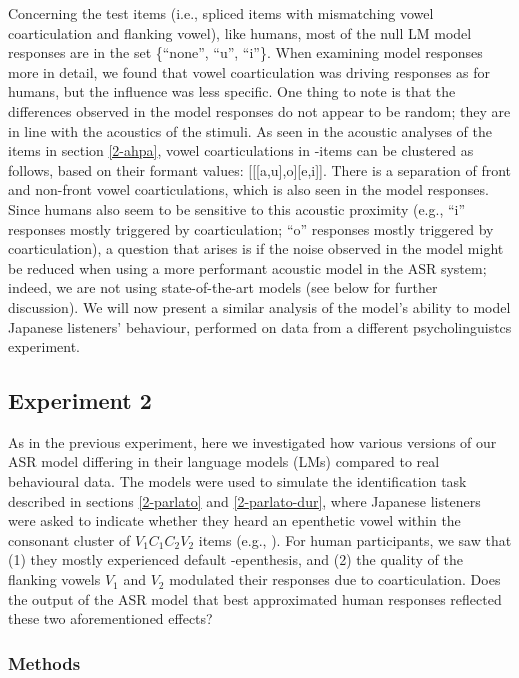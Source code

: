 {Concerning the test items (i.e., spliced items with mismatching vowel coarticulation and flanking vowel), like humans, most of the null LM model responses are in the set \{``none'', ``u'', ``i''\}. When examining model responses more in detail, we found that vowel coarticulation was driving responses as for humans, but the influence was less specific. One thing to note is that the differences observed in the model responses do not appear to be random; they are in line with the acoustics of the stimuli. As seen in the acoustic analyses of the items in section \ref{2-ahpa}, vowel coarticulations in -items can be clustered as follows, based on their formant values: [[[a,u],o][e,i]]. There is a separation of front and non-front vowel coarticulations, which is also seen in the model responses. Since humans also seem to be sensitive to this acoustic proximity (e.g., ``i'' responses mostly triggered by \textipa{[i,e]} coarticulation; ``o'' responses mostly triggered by \textipa{[o,u]} coarticulation), a question that arises is if the noise observed in the model might be reduced when using a more performant acoustic model in the ASR system; indeed, we are not using state-of-the-art models (see below for further discussion). We will now present a similar analysis of the model's ability to model Japanese listeners' behaviour, performed on data from a different psycholinguistcs experiment.       

\subsection{Experiment 2}
As in the previous experiment, here we investigated how various versions of our ASR model differing in their language models (LMs) compared to real behavioural data.
The models were used to simulate the identification task described in sections \ref{2-parlato} and \ref{2-parlato-dur}, where Japanese listeners were asked to indicate whether they heard an epenthetic vowel within the consonant cluster of $V_{1}C_{1}C_{2}V_{2}$ items (e.g., ). For human participants, we saw that (1) they mostly experienced default -epenthesis, and (2) the quality of the flanking vowels $V_{1}$ and $V_{2}$ modulated their responses due to coarticulation. Does the output of the ASR model that best approximated human responses reflected these two aforementioned effects? 

\subsubsection{Methods}
}
